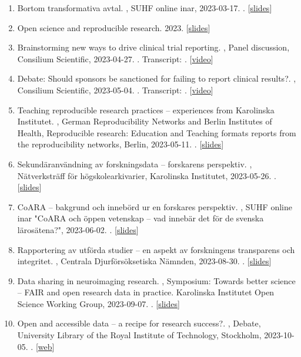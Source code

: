 \documentclass[10pt,a4paper,twocolumn]{article}
\begin{document}
\begin{enumerate}
    \item Bortom transformativa avtal. , SUHF online inar, 2023-03-17. . [\href{https://osf.io/85a6x}{slides}]

    \item Open science and reproducible research. 2023. [\href{https://osf.io/5a8f2}{slides}]

    \item Brainstorming new ways to drive clinical trial reporting. , Panel discussion, Consilium Scientific, 2023-04-27. . Transcript: . [\href{https://www.youtube.com/watch?v=HohWoE3bMi0}{video}]

    \item Debate: Should sponsors be sanctioned for failing to report clinical results?. , Consilium Scientific, 2023-05-04. . Transcript: . [\href{https://www.youtube.com/watch?v=IjsGeVlkXeE}{video}]

    \item Teaching reproducible research practices – experiences from Karolinska Institutet. , German Reproducibility Networks and Berlin Institutes of Health, Reproducible research: Education and Teaching formats reports from the reproducibility networks, Berlin, 2023-05-11. . [\href{https://osf.io/e6vrj}{slides}]

    \item Sekundäranvändning av forskningsdata – forskarens perspektiv. , Nätverksträff för högskolearkivarier, Karolinska Institutet, 2023-05-26. . [\href{https://osf.io/xthbf}{slides}]

    \item CoARA – bakgrund och innebörd ur en forskares perspektiv. , SUHF online inar "CoARA och öppen vetenskap – vad innebär det för de svenska lärosätena?", 2023-06-02. . [\href{https://osf.io/85a6x}{slides}]

    \item Rapportering av utförda studier – en aspekt av forskningens transparens och integritet. , Centrala Djurförsöksetiska Nämnden, 2023-08-30. . [\href{https://osf.io/jc7dy}{slides}]

    \item Data sharing in neuroimaging research. , Symposium: Towards better science – FAIR and open research data in practice. Karolinska Institutet Open Science Working Group, 2023-09-07. . [\href{https://osf.io/fk3ny}{slides}]

    \item Open and accessible data – a recipe for research success?. , Debate, University Library of the Royal Institute of Technology, Stockholm, 2023-10-05. . [\href{https://www.kth.se/en/biblioteket/kalender/evenemang/oppen-och-tillganglig-data-framgangsrecept-for-forskning-1.1270470}{web}]


\end{enumerate}
\end{document}
